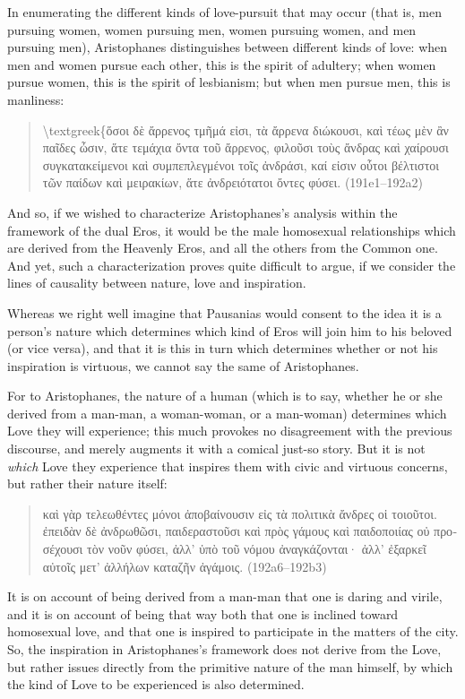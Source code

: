 In enumerating the different kinds of love-pursuit that may occur (that
is, men pursuing women, women pursuing men, women pursuing women, and
men pursuing men), Aristophanes distinguishes between different kinds of
love: when men and women pursue each other, this is the spirit of
adultery; when women pursue women, this is the spirit of lesbianism; but
when men pursue men, this is manliness:

\begin{quote}
\textbackslash{}textgreek\{ὅσοι δὲ ἄρρενος τμῆμά εἰσι, τὰ ἄρρενα
διώκουσι, καὶ τέως μὲν ἂν παῖδες ὦσιν, ἅτε τεμάχια ὄντα τοῦ ἄρρενος,
φιλοῦσι τοὺς ἄνδρας καὶ χαίρουσι συγκατακείμενοι καὶ συμπεπλεγμένοι τοῖς
ἀνδράσι, καί εἰσιν οὗτοι βέλτιστοι τῶν παίδων καὶ μειρακίων, ἅτε
ἀνδρειότατοι ὄντες φύσει. (191e1--192a2)
\end{quote}

And so, if we wished to characterize Aristophanes's analysis within the
framework of the dual Eros, it would be the male homosexual
relationships which are derived from the Heavenly Eros, and all the
others from the Common one. And yet, such a characterization proves
quite difficult to argue, if we consider the lines of causality between
nature, love and inspiration.

Whereas we right well imagine that Pausanias would consent to the idea
it is a person's nature which determines which kind of Eros will join
him to his beloved (or vice versa), and that it is this in turn which
determines whether or not his inspiration is virtuous, we cannot say the
same of Aristophanes.

For to Aristophanes, the nature of a human (which is to say, whether he
or she derived from a man-man, a woman-woman, or a man-woman) determines
which Love they will experience; this much provokes no disagreement with
the previous discourse, and merely augments it with a comical just-so
story. But it is not \emph{which} Love they experience that inspires
them with civic and virtuous concerns, but rather their nature itself:

\begin{quote}
\textgreek{καὶ γὰρ τελεωθέντες μόνοι ἀποβαίνουσιν εἰς τὰ πολιτικὰ ἄνδρες οἱ
τοιοῦτοι. ἐπειδὰν δὲ ἀνδρωθῶσι, παιδεραστοῦσι καὶ πρὸς γάμους καὶ
παιδοποιίας οὐ προσέχουσι τὸν νοῦν φύσει, ἀλλ' ὑπὸ τοῦ νόμου
ἀναγκάζονται· ἀλλ' ἐξαρκεῖ αὐτοῖς μετ' ἀλλήλων καταζῆν ἀγάμοις.}
(192a6--192b3)
\end{quote}

It is on account of being derived from a man-man that one is daring and
virile, and it is on account of being that way both that one is inclined
toward homosexual love, and that one is inspired to participate in the
matters of the city. So, the inspiration in Aristophanes's framework
does not derive from the Love, but rather issues directly from the
primitive nature of the man himself, by which the kind of Love to be
experienced is also determined.

